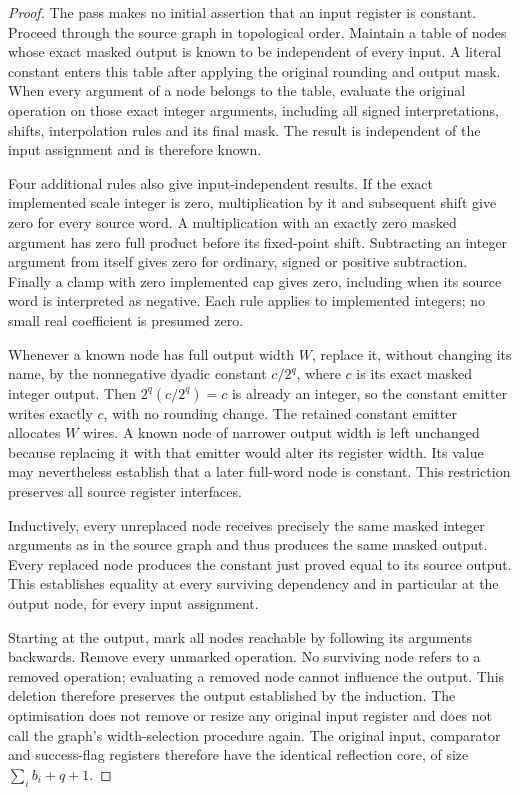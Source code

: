 \begin{proof}
The pass makes no initial assertion that an input register is constant.
Proceed through the source graph in topological order. Maintain a table of
nodes whose exact masked output is known to be independent of every input.
A literal constant enters this table after applying the original rounding
and output mask. When every argument of a node belongs to the table, evaluate
the original operation on those exact integer arguments, including all
signed interpretations, shifts, interpolation rules and its final mask.
The result is independent of the input assignment and is therefore known.

Four additional rules also give input-independent results. If the exact
implemented scale integer is zero, multiplication by it and subsequent shift
give zero for every source word. A multiplication with an exactly zero
masked argument has zero full product before its fixed-point shift.
Subtracting an integer argument from itself gives zero for ordinary, signed
or positive subtraction. Finally a clamp with zero implemented cap gives
zero, including when its source word is interpreted as negative. Each rule
applies to implemented integers; no small real coefficient is presumed zero.

Whenever a known node has full output width $W$, replace it, without changing
its name, by the nonnegative dyadic constant $c/2^q$, where $c$ is its exact
masked integer output. Then $2^q(c/2^q)=c$ is already an integer, so the
constant emitter writes exactly $c$, with no rounding change. The retained
constant emitter allocates $W$ wires. A known node of narrower output width
is left unchanged because replacing it with that emitter would alter its
register width. Its value may nevertheless establish that a later full-word
node is constant. This restriction preserves all source register interfaces.

Inductively, every unreplaced node receives precisely the same masked integer
arguments as in the source graph and thus produces the same masked output.
Every replaced node produces the constant just proved equal to its source
output. This establishes equality at every surviving dependency and in
particular at the output node, for every input assignment.

Starting at the output, mark all nodes reachable by following its arguments
backwards. Remove every unmarked operation. No surviving node refers to a
removed operation; evaluating a removed node cannot influence the output.
This deletion therefore preserves the output established by the induction.
The optimisation does not remove or resize any original input register and
does not call the graph's width-selection procedure again. The original
input, comparator and success-flag registers therefore have the identical
reflection core, of size $\sum_i b_i+q+1$.
\end{proof}

